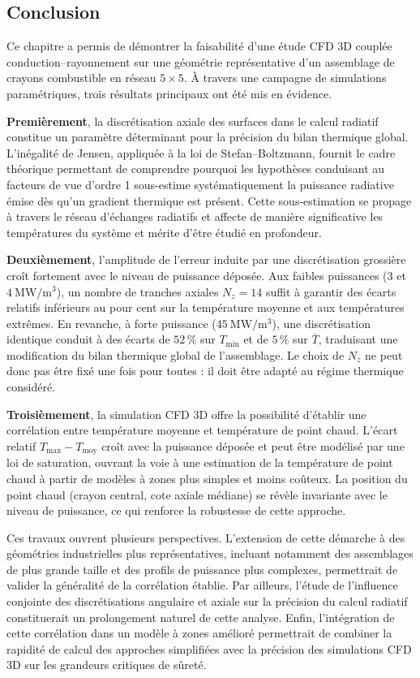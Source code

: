 \subsection{Conclusion}

Ce chapitre a permis de démontrer la faisabilité d'une étude CFD 3D couplée conduction--rayonnement sur une géométrie représentative d'un assemblage de crayons combustible en réseau $5\times5$. À travers une campagne de simulations paramétriques, trois résultats principaux ont été mis en évidence.

\textbf{Premièrement}, la discrétisation axiale des surfaces dans le calcul radiatif constitue un paramètre déterminant pour la précision du bilan thermique global. L'inégalité de Jensen, appliquée à la loi de Stefan--Boltzmann, fournit le cadre théorique permettant de comprendre pourquoi les hypothèses conduisant au facteurs de vue d'ordre 1 sous-estime systématiquement la puissance radiative émise dès qu'un gradient thermique est présent. Cette sous-estimation se propage à travers le réseau d'échanges radiatifs et affecte de manière significative les températures du système et mérite d'être étudié en profondeur.

\textbf{Deuxièmement}, l'amplitude de l'erreur induite par une discrétisation grossière croît fortement avec le niveau de puissance déposée. Aux faibles puissances ($3$ et $4~\mathrm{MW/m^3}$), un nombre de tranches axiales $N_z = 14$ suffit à garantir des écarts relatifs inférieurs au pour cent sur la température moyenne et aux températures extrêmes. En revanche, à forte puissance ($45~\mathrm{MW/m^3}$), une discrétisation identique conduit à des écarts de $52\,\%$ sur $T_{\min}$ et de $5\,\%$ sur $\overline{T}$, traduisant une modification du bilan thermique global de l'assemblage. Le choix de $N_z$ ne peut donc pas être fixé une fois pour toutes : il doit être adapté au régime thermique considéré.

\textbf{Troisièmement}, la simulation CFD 3D offre la possibilité d'établir une corrélation entre température moyenne et température de point chaud. L'écart relatif $T_{\mathrm{max}} - T_{\mathrm{moy}}$ croît avec la puissance déposée et peut être modélisé par une loi de saturation, ouvrant la voie à une estimation de la température de point chaud à partir de modèles à zones plus simples et moins coûteux. La position du point chaud (crayon central, cote axiale médiane) se révèle invariante avec le niveau de puissance, ce qui renforce la robustesse de cette approche.

Ces travaux ouvrent plusieurs perspectives. L'extension de cette démarche à des géométries industrielles plus représentatives, incluant notamment des assemblages de plus grande taille et des profils de puissance plus complexes, permettrait de valider la généralité de la corrélation établie. Par ailleurs, l'étude de l'influence conjointe des discrétisations angulaire et axiale sur la précision du calcul radiatif constituerait un prolongement naturel de cette analyse. Enfin, l'intégration de cette corrélation dans un modèle à zones amélioré permettrait de combiner la rapidité de calcul des approches simplifiées avec la précision des simulations CFD 3D sur les grandeurs critiques de sûreté.
